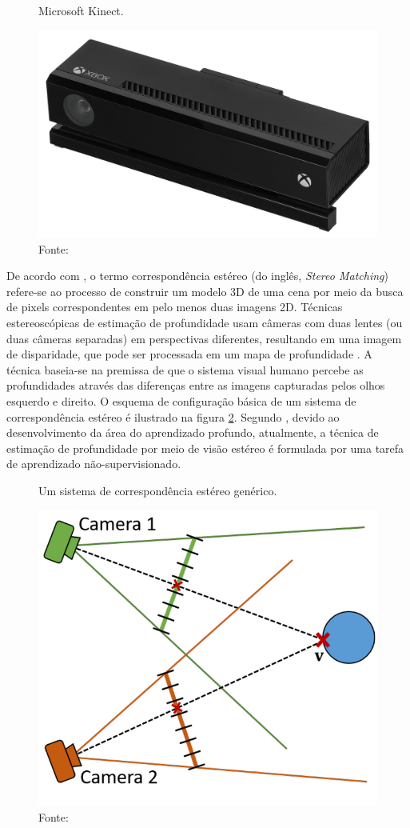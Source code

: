 \begin{figure}[h]
    \centering
    \caption{Microsoft Kinect.}
    \includegraphics[width=.6\textwidth]{fig/kinect.jpg}
    \caption*{Fonte: \cite{kinect}}
    \label{fig:kinect}
\end{figure}

De acordo com , o termo correspondência estéreo (do inglês, \textit{Stereo Matching}) refere-se ao processo de construir um modelo 3D de uma cena por meio da busca de pixels correspondentes em pelo menos duas imagens 2D. Técnicas estereoscópicas de estimação de profundidade usam câmeras com duas lentes (ou duas câmeras separadas) em perspectivas diferentes, resultando em uma imagem de disparidade, que pode ser processada em um mapa de profundidade \cite{castellano2023performance}. A técnica baseia-se na premissa de que o sistema visual humano percebe as profundidades através das diferenças entre as imagens capturadas pelos olhos esquerdo e direito. O esquema de configuração básica de um sistema de correspondência estéreo é ilustrado na figura \ref{fig:stereo}. Segundo , devido ao desenvolvimento da área do aprendizado profundo, atualmente, a técnica de estimação de profundidade por meio de visão estéreo é formulada por uma tarefa de aprendizado não-supervisionado.

\begin{figure}[h!]
    \centering
    \caption{Um sistema de correspondência estéreo genérico. }
    \includegraphics[width=.6\textwidth]{fig/stereo_cams.png}
    \caption*{Fonte: \cite{zollhofer2019commodity}}
    \label{fig:stereo}
\end{figure}

